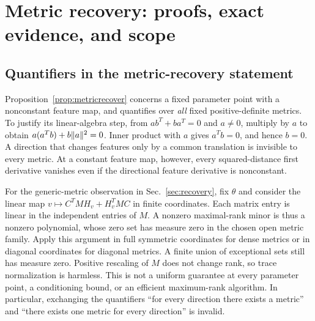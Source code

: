 \section{Metric recovery: proofs, exact evidence, and scope}
\label{app:recovery}
\subsection{Quantifiers in the metric-recovery statement}
Proposition~\ref{prop:metricrecover} concerns a fixed parameter point
with a nonconstant feature map, and quantifies over \emph{all} fixed
positive-definite metrics. To justify its linear-algebra step, from
$ab^T+ba^T=0$ and $a\ne0$, multiply by $a$ to obtain
$a(a^Tb)+b\lVert a\rVert^2=0$. Inner product with $a$ gives $a^Tb=0$,
and hence $b=0$. A direction that changes features only by a common
translation is invisible to every metric. At a constant feature map,
however, every squared-distance first derivative vanishes even if
the directional feature derivative is nonconstant.

For the generic-metric observation in Sec.~\ref{sec:recovery}, fix
$\theta$ and consider the linear map
$v\mapsto C^TMH_v+H_v^TMC$ in finite coordinates. Each matrix entry
is linear in the independent entries of $M$. A nonzero maximal-rank
minor is thus a nonzero polynomial, whose zero set has measure zero
in the chosen open metric family. Apply this argument in full
symmetric coordinates for dense metrics or in diagonal coordinates
for diagonal metrics. A finite union of exceptional sets still has
measure zero. Positive rescaling of $M$ does not change rank, so
trace normalization is harmless. This is not a uniform guarantee at
every parameter point, a conditioning bound, or an efficient
maximum-rank algorithm. In particular, exchanging the quantifiers
``for every direction there exists a metric'' and ``there exists one
metric for every direction'' is invalid.

